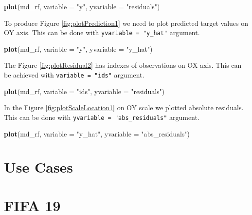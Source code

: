\documentclass[]{krantz}
\newenvironment{Shaded}{\begin{snugshade}}{\end{snugshade}}
\newcommand{\DataTypeTok}[1]{\textcolor[rgb]{0.13,0.29,0.53}{#1}}
\newcommand{\KeywordTok}[1]{\textcolor[rgb]{0.13,0.29,0.53}{\textbf{#1}}}
\newcommand{\NormalTok}[1]{#1}
\newcommand{\StringTok}[1]{\textcolor[rgb]{0.31,0.60,0.02}{#1}}
\begin{document}
\begin{Shaded}
\begin{Highlighting}[]
\KeywordTok{plot}\NormalTok{(md_rf, }\DataTypeTok{variable =} \StringTok{"y"}\NormalTok{, }\DataTypeTok{yvariable =} \StringTok{"residuals"}\NormalTok{) }
\end{Highlighting}
\end{Shaded}

To produce Figure \ref{fig:plotPrediction1} we need to plot predicted target values on OY axis. This can be done with \texttt{yvariable\ =\ "y\_hat"} argument.

\begin{Shaded}
\begin{Highlighting}[]
\KeywordTok{plot}\NormalTok{(md_rf, }\DataTypeTok{variable =} \StringTok{"y"}\NormalTok{, }\DataTypeTok{yvariable =} \StringTok{"y_hat"}\NormalTok{) }
\end{Highlighting}
\end{Shaded}

The Figure \ref{fig:plotResidual2} has indexes of observations on OX axis. This can be achieved with \texttt{variable\ =\ "ids"} argument.

\begin{Shaded}
\begin{Highlighting}[]
\KeywordTok{plot}\NormalTok{(md_rf, }\DataTypeTok{variable =} \StringTok{"ids"}\NormalTok{, }\DataTypeTok{yvariable =} \StringTok{"residuals"}\NormalTok{)}
\end{Highlighting}
\end{Shaded}

In the Figure \ref{fig:plotScaleLocation1} on OY scale we plotted absolute residuals. This can be done with \texttt{yvariable\ =\ "abs\_residuals"} argument.

\begin{Shaded}
\begin{Highlighting}[]
\KeywordTok{plot}\NormalTok{(md_rf, }\DataTypeTok{variable =} \StringTok{"y_hat"}\NormalTok{, }\DataTypeTok{yvariable =} \StringTok{"abs_residuals"}\NormalTok{)}
\end{Highlighting}
\end{Shaded}

\hypertarget{use-cases}{%
\chapter*{Use Cases}\label{use-cases}}

\hypertarget{UseCaseFIFA}{%
\chapter{FIFA 19}\label{UseCaseFIFA}}
\end{document}
